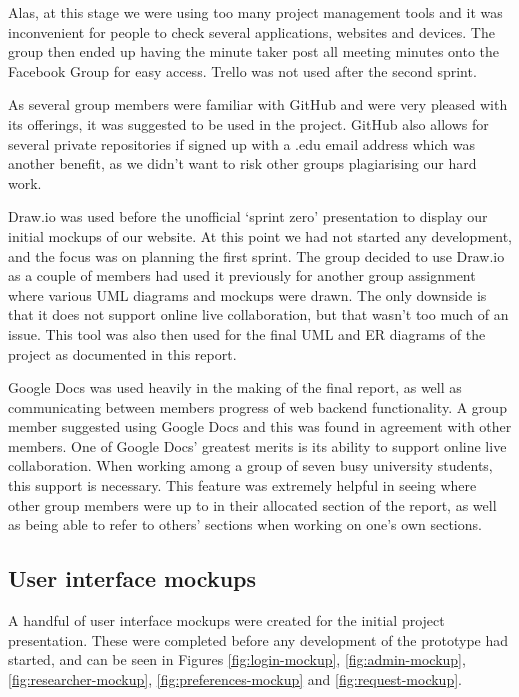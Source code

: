 \documentclass[a4paper,titlepage,12pt]{article}
\begin{document}
Alas, at this stage we were using too many project management tools and it was
inconvenient for people to check several applications, websites and devices.
The group then ended up having the minute taker post all meeting minutes onto
the Facebook Group for easy access. Trello was not used after the second
sprint.

As several group members were familiar with GitHub and were very pleased with
its offerings, it was suggested to be used in the project. GitHub also allows
for several private repositories if signed up with a .edu email address which
was another benefit, as we didn't want to risk other groups plagiarising our
hard work.

Draw.io was used before the unofficial `sprint zero' presentation to display
our initial mockups of our website. At this point we had not started any
development, and the focus was on planning the first sprint. The group decided
to use Draw.io as a couple of members had used it previously for another group
assignment where various UML diagrams and mockups were drawn. The only downside
is that it does not support online live collaboration, but that wasn't too much
of an issue. This tool was also then used for the final UML and ER diagrams of
the project as documented in this report.

Google Docs was used heavily in the making of the final report, as well as
communicating between members progress of web backend functionality. A group
member suggested using Google Docs and this was found in agreement with other
members. One of Google Docs' greatest merits is its ability to support online
live collaboration. When working among a group of seven busy university
students, this support is necessary. This feature was extremely helpful in
seeing where other group members were up to in their allocated section of the
report, as well as being able to refer to others' sections when working on
one's own sections.

\subsection{User interface mockups}

A handful of user interface mockups were created for the initial project
presentation. These were completed before any development of the prototype had
started, and can be seen in Figures \ref{fig:login-mockup},
\ref{fig:admin-mockup}, \ref{fig:researcher-mockup},
\ref{fig:preferences-mockup} and \ref{fig:request-mockup}.
\end{document}
